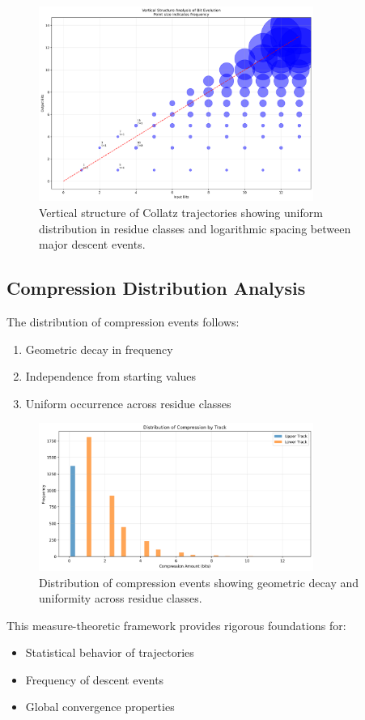 \begin{figure}[h]
\centering
\includegraphics[width=0.8\textwidth]{entropy/vertical_structure.png}
\caption{Vertical structure of Collatz trajectories showing uniform distribution in residue classes and logarithmic spacing between major descent events.}
\label{fig:vertical_structure}
\end{figure}

\subsection{Compression Distribution Analysis}

\begin{theorem}\label{thm:compression_dist}
The distribution of compression events follows:
\begin{enumerate}
\item Geometric decay in frequency
\item Independence from starting values
\item Uniform occurrence across residue classes
\end{enumerate}
\end{theorem}

\begin{figure}[h]
\centering
\includegraphics[width=0.8\textwidth]{entropy/compression_distribution.png}
\caption{Distribution of compression events showing geometric decay and uniformity across residue classes.}
\label{fig:compression_dist}
\end{figure}

This measure-theoretic framework provides rigorous foundations for:
\begin{itemize}
\item Statistical behavior of trajectories
\item Frequency of descent events
\item Global convergence properties
\end{itemize} 